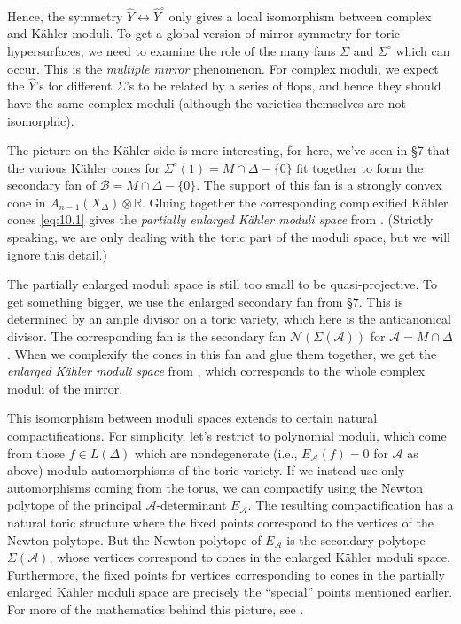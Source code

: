 \documentclass{amsart}
\theoremstyle{plain}
\theoremstyle{definition}
\begin{document}
	Hence, the symmetry $\widehat Y \leftrightarrow \widehat
Y^\circ$ only gives a local isomorphism between complex and K\"ahler
moduli.  To get a global version of mirror symmetry for toric
hypersurfaces, we need to examine the role of the many fans $\Sigma$
and $\Sigma^\circ$ which can occur.  This is the {\it multiple
mirror\/} phenomenon.  For complex moduli, we expect the $\widehat
Y$'s for different $\Sigma$'s to be related by a series of flops, and
hence they should have the same complex moduli (although the varieties
themselves are not isomorphic).  

	The picture on the K\"ahler side is more interesting, for
here, we've seen in \S7 that the various K\"ahler cones for
$\Sigma^\circ(1) = M\cap\Delta-\{0\}$ fit together to form the
secondary fan of $\mathcal{B} = M\cap\Delta-\{0\}$.  The support of this
fan is a strongly convex cone in $A_{n-1}(X_\Delta)\otimes\mathbb{R}$.
Gluing together the corresponding complexified K\"ahler cones
\eqref{eq:10.1} gives the {\it partially enlarged K\"ahler moduli
space\/} from \cite{AGM1}.  (Strictly speaking, we are only dealing
with the toric part of the moduli space, but we will ignore this
detail.)

	The partially enlarged moduli space is still too small to be
quasi-projective.  To get something bigger, we use the enlarged
secondary fan from \S7.  This is determined by an ample divisor on a
toric variety, which here is the anticanonical divisor.  The
corresponding fan is the secondary fan $\mathcal{N}(\Sigma(\mathcal{A}))$ for
$\mathcal{A} = M\cap\Delta$.  When we complexify the cones in this fan and
glue them together, we get the {\it enlarged K\"ahler moduli space\/}
from \cite{AGM1}, which corresponds to the whole complex moduli of the
mirror.

	This isomorphism between moduli spaces extends to certain
natural compactifications.  For simplicity, let's restrict to
polynomial moduli, which come from those $f \in L(\Delta)$ which are
nondegenerate (i.e., $E_{\mathcal{A}}(f) = 0$ for $\mathcal{A}$ as above)
modulo automorphisms of the toric variety.  If we instead use only
automorphisms coming from the torus, we can compactify using the
Newton polytope of the principal $\mathcal{A}$-determinant $E_{\mathcal{A}}$.
The resulting compactification has a natural toric structure where the
fixed points correspond to the vertices of the Newton polytope.  But
the Newton polytope of $E_{\mathcal{A}}$ is the secondary polytope
$\Sigma(\mathcal{A})$, whose vertices correspond to cones in the enlarged
K\"ahler moduli space.  Furthermore, the fixed points for vertices
corresponding to cones in the partially enlarged K\"ahler moduli space
are precisely the ``special'' points mentioned earlier.  For more of
the mathematics behind this picture, see \cite{AGM2}.
\end{document}
